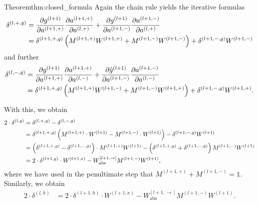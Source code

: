 \begin{proofref}{Theorem}{thm:closed_formula}
    Again the chain rule yields the iterative formulas
    \begin{align}
        \delta^{(l,+,g)}
            &= \frac{\partial g^{(l+1)}}{\partial a^{(l+1,+)}}
                \frac{\partial a^{(l+1,+)}}{\partial a^{(l,+)}}
             + \frac{\partial g^{(l+1)}}{\partial a^{(l+1,-)}}
                \frac{\partial a^{(l+1,-)}}{\partial a^{(l,+)}} \notag\\
            &= \delta^{(l+1,+,g)} \left( M^{(l+1, +)} W^{(l+1, +)} + M^{(l+1, -)} W^{(l+1, -)} \right)
                + \delta^{(l+1,-,g)} W^{(l+1, -)} \label{eq:delta_pg_recursion}
    \end{align}
    and further
    \begin{align}
        \delta^{(l,-,g)}
            &= \frac{\partial g^{(l+1)}}{\partial a^{(l+1,+)}}
               \frac{\partial a^{(l+1,+)}}{\partial a^{(l,-)}}
             + \frac{\partial \hat g^{(l+1)}}{\partial a^{(l+1,-)}}
               \frac{\partial a^{(l+1,-)}}{\partial a^{(l,-)}} \notag\\
            &= \delta^{(l+1,+,g)} \left(M^{(l+1, +)} W^{(l+1, -)} + M^{(l+1, -)} W^{(l+1, +)} \right)
                + \delta^{(l+1,-,g)} W^{(l+1, +)} \label{eq:delta_ng_recursion}.
    \end{align}
    
    With this, we obtain
    \begin{align}
        2 \cdot \delta^{(l, g)}
            &= \delta^{(l,+,g)} - \delta^{(l,-,g)} \notag\\
            &= \delta^{(l+1,+,g)} \left(M^{(l+1, +)} \cdot W^{(l+1)} - M^{(l+1, -)} \cdot W^{(l+1)} \right)
                - \delta^{(l+1,-,g)} W^{(l+1)} \notag\\
            &= \left( \delta^{(l+1,+,g)} - \delta^{(l+1,-,g)} \right) \cdot M^{(l+1, +)} W^{(l+1)}
                - \left( \delta^{(l+1,+,g)} + \delta^{(l+1,-,g)} \right) M^{(l+1, -)} W^{(l+1)} \notag\\
            &= 2 \cdot \delta^{(l+1, g)} \cdot W^{(l+1, x)} - W_{\text{abs}}^{[l+1, \rightarrow]} M^{(l+1, -)} W^{(l+1)} \label{eq:delta_g_recursion},
    \end{align}
    where we have used in the penultimate step that $M^{(l+1, +)} + M^{(l+1, -)} = \mathbb{1}$.
    Similarly, we obtain
    \begin{align}
        2 \cdot \delta^{(l, h)}
            &= 2 \cdot \delta^{(l+1, h)} \cdot W^{(l+1, x)} - W_{\text{abs}}^{[l+1, \rightarrow]} M^{(l+1, -)} W^{(l+1)} \label{eq:delta_h_recursion}.
    \end{align}


\end{proofref}
